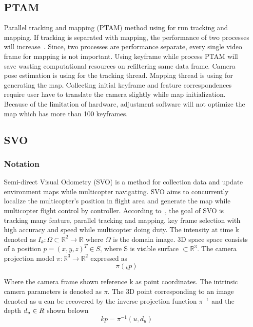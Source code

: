 \documentclass[12pt, a4paper]{aitthesis}
\begin{document}
\subsection{PTAM}

Parallel tracking and mapping (PTAM) method using for run tracking and mapping. If tracking is separated with mapping, the performance of two processes will increase~. Since, two processes are performance separate, every single video frame for mapping is not important. Using keyframe while process PTAM will save wasting computational resources on  refiltering same data frame. Camera pose estimation is using for the tracking thread. Mapping thread is using for generating the map. Collecting initial keyframe and feature correspondences require user have to translate the camera slightly while map initialization. Because of the limitation of hardware, adjustment software will not optimize the map which has more than 100 keyframes. 

\subsection{ SVO}
\subsubsection{Notation}

Semi-direct Visual Odometry (SVO) is a method for collection data and update environment maps while multicopter navigating. SVO aims to concurrently localize the multicopter’s position in flight area and generate the map while multicopter flight control by controller. According to~, the goal of SVO is tracking many feature, parallel tracking and mapping, key frame selection with high accuracy and speed while multicopter doing duty. The intensity at time k denoted as $I_{k}: \Omega \subset \mathbb{R}^{2} \to \mathbb{R}$ where $\Omega$ is the domain image. 3D space space consists of a
position $p= (x, y, z)^{T} \in S$, where S is visible surface $\subset \mathbb{R}^{3}$. The camera projection model $\pi: \mathbb{R}^{3} \to \mathbb{R}^{2}$ expressed as 
\[
    \pi(_{k}p)
\]

Where the camera frame shown reference k as point coordinates. The intrinsic camera parameters is denoted as $\pi$. The 3D point corresponding to an image denoted as u can be recovered by the inverse projection function $\pi^{-1}$ and the depth $d_{u} \in \mathnormal{R}$ shown belown 
\[
    kp = \pi ^{-1} (u,d_{u})
\]
\end{document}
